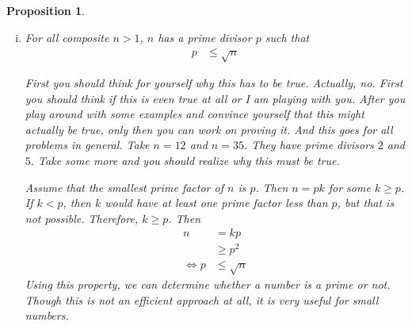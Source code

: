 \documentclass[a4paper, leqno]{article}
\newtheorem{proposition}{Proposition}
\theoremstyle{definition}
\theoremstyle{remark}
\begin{document}
\begin{proposition}
\begin{enumerate}[i.]
{					What the proposition says is that, for positive integer $a,b$ there are unique integer $q$ and a unique positive integer $r$ such that $b=aq+r$ and $0\leq r<a$. We can prove this easily as well. And the uniqueness of $r$ can prove the uniqueness of $q$ as well (and vice versa). For the sake of contradiction, suppose that,
						\begin{align*}
							b = aq_1+r_1 & = aq_2+r_2
						\end{align*}
					where both $0\leq r_1,r_2<a$. From the latter, we get
						\begin{align*}
							a(q_1-q_2) & = r_2-r_1
						\end{align*}
					This equation says that $a$ divides $r_2-r_1$. Unless $|r_2-r_1|=0$, this can not be true (why?). The conclusion follows.}
					\item For all composite $n > 1$, $n$ has a prime divisor $p$ such that
						\begin{align*}
							p & \leq \sqrt{n}
						\end{align*}
					{\normalfont First you should think for yourself why this has to be true. Actually, no. First you should think if this is even true at all or I am playing with you. After you play around with some examples and convince yourself that this might actually be true, only then you can work on proving it. And this goes for all problems in general. Take $n=12$ and $n=35$. They have prime divisors $2$ and $5$. Take some more and you should realize why this must be true.
					
					Assume that the smallest prime factor of $n$ is $p$. Then $n = pk$ for some
					$k\geq p$. If $k < p$, then $k$ would have at least one prime factor less than
					$p$, but that is not possible. Therefore, $k \geq p$. Then
						\begin{align*}
							n & = kp\\
							  & \geq p^2\\
							\iff p& \leq \sqrt{n}
						\end{align*}
					Using this property, we can determine whether a number is a prime or
					not. Though this is not an efficient approach at all, it is very useful for
					small numbers.}
				\end{enumerate}
		\end{proposition}
	
\end{document}
